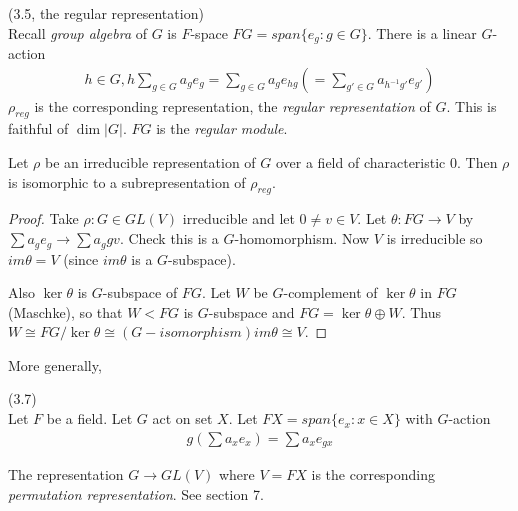 \documentclass[a4paper]{article}
\begin{document}
\begin{defi} (3.5, the regular representation)\\
Recall \emph{group algebra} of $G$ is $F$-space $FG = span\{e_g:g \in G\}$. There is a linear $G$-action
\begin{equation*}
\begin{aligned}
h \in G, h \sum_{g \in G} a_g e_g = \sum_{g \in G} a_g e_{hg} (=\sum_{g' \in G} a_{h^{-1} g'} e_{g'})
\end{aligned}
\end{equation*}
$\rho_{reg}$ is the corresponding representation, the \emph{regular representation} of $G$. This is faithful of $\dim |G|$. $FG$ is the \emph{regular module}.
\end{defi}

\begin{prop}
Let $\rho$ be an irreducible representation of $G$ over a field of characteristic 0. Then $\rho$ is isomorphic to a subrepresentation of $\rho_{reg}$.
\begin{proof}
Take $\rho: G \in GL(V)$ irreducible and let $0 \neq v \in V$. Let $\theta : FG \to V$ by $\sum a_g e_g \to \sum a_g gv$. Check this is a $G$-homomorphism. Now $V$ is irreducible so $im\theta = V$ (since $im\theta$ is a $G$-subspace).

Also $\ker\theta$ is $G$-subspace of $FG$. Let $W$ be $G$-complement of $\ker \theta$ in $FG$ (Maschke), so that $W < FG$ is $G$-subspace and $FG = \ker\theta \oplus W$. Thus $W \cong FG/\ker \theta \cong(G-isomorphism) im\theta \cong V$.
\end{proof}
\end{prop}

More generally,
\begin{defi} (3.7)\\
Let $F$ be a field. Let $G$ act on set $X$. Let $FX = span\{e_x:x \in X\}$ with $G$-action
\begin{equation*}
\begin{aligned}
g(\sum a_x e_x) = \sum a_x e_{gx}
\end{aligned}
\end{equation*}
\end{defi}

The representation $G \to GL(V)$ where $V=FX$ is the corresponding \emph{permutation representation}. See section 7.

\newpage
\end{document}
